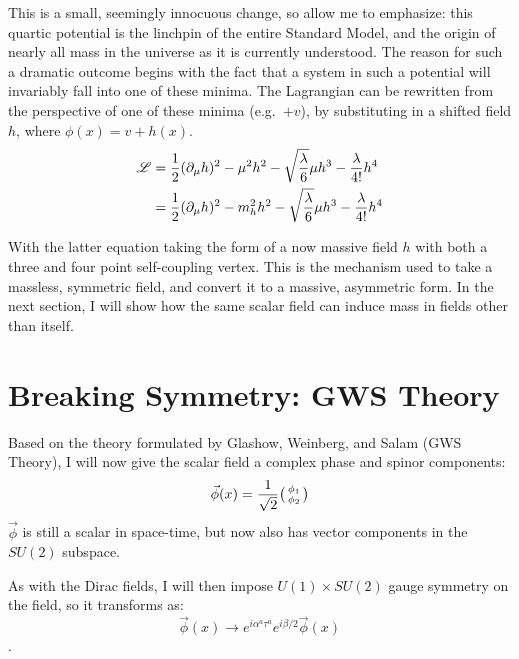     This is a small, seemingly innocuous change, so allow me to emphasize:
        this quartic potential is the linchpin of the entire Standard Model,
        and the origin of nearly all mass in the universe as it is currently understood.
    The reason for such a dramatic outcome begins with the fact that
        a system in such a potential will invariably fall into one of these minima.
    The Lagrangian can be rewritten from the perspective of one of these minima (e.g.\ $+v$),
        by substituting in a shifted field $h$, where $\phi(x)=v+h(x)$.
    \begin{equation} \begin{split} \label{eq:basic_higgs}
        \mathscr{L} & = \frac{1}{2} (\partial_{\mu} h)^2
            - \mu^2 h^2
            -\sqrt{\frac{\lambda}{6}} \mu h^3
            - \frac{\lambda}{4!} h^4 \\
         & = \frac{1}{2} (\partial_{\mu} h)^2
            - m^2_{h} h^2
            -\sqrt{\frac{\lambda}{6}} \mu h^3
            - \frac{\lambda}{4!} h^4 \\
    \end{split} \end{equation} %

    With the latter equation taking the form of a now massive field $h$ with both a three and four point self-coupling vertex.
    This is the mechanism used to take a massless, symmetric field,
        and convert it to a massive, asymmetric form.
    In the next section, I will show how the same scalar field can induce mass in fields other than itself.


\section{Breaking Symmetry: GWS Theory}

    Based on the theory formulated by Glashow, Weinberg, and Salam (GWS Theory),
        I will now give the scalar field a complex phase and spinor components:
    \begin{equation}
        \vec{\phi}(x) = \frac{1}{\sqrt{2}} \big(\begin{smallmatrix} \phi_1 \\ \phi_2 \end{smallmatrix}\big)
    \end{equation}
    $\vec{\phi}$ is still a scalar in space-time, but now also has vector components in the $SU(2)$ subspace.

    As with the Dirac fields, I will then impose $U(1) \times SU(2)$ gauge symmetry on the field, so it transforms as:
    \begin{equation}
        \vec{\phi}(x) \rightarrow e^{i \alpha^a \tau^a} e^{i \beta/2 } \vec{\phi}(x)
    \end{equation}.

